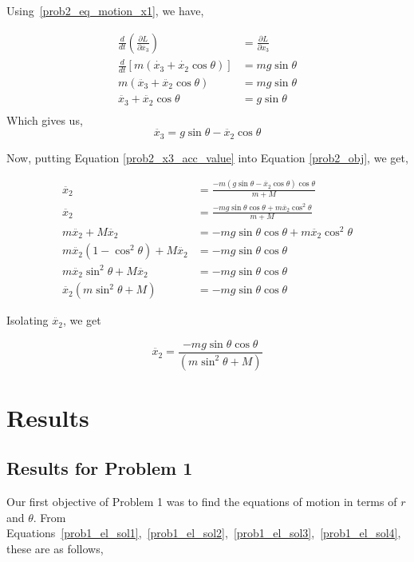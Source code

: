 \documentclass[conference]{IEEEtran}
\begin{document}
Using~\ref{prob2_eq_motion_x1}, we have,

\begin{align*}
    \frac{d}{dt} \left(\frac{\partial L}{\partial \dot{x_3}}\right) &= \frac{\partial L}{ \partial x_3}\\
    \frac{d}{dt} \left[m(\dot{x_3} + \dot{x_2}\cos\theta)\right] &= mg\sin\theta\\
    m (\ddot{x_3} + \ddot{x_2}\cos\theta) &= mg\sin\theta\\
    \ddot{x_3} + \ddot{x_2}\cos\theta &= g\sin\theta\\
\end{align*}
Which gives us,
\begin{equation}\label{prob2_x3_acc_value}
    \ddot{x_3} = g\sin\theta - \ddot{x_2}\cos\theta
\end{equation}

Now, putting Equation \ref{prob2_x3_acc_value} into Equation \ref{prob2_obj}, we get,

\begin{align*}
    \ddot{x_2} &= \frac{- m(g\sin\theta - \ddot{x_2}\cos\theta)\cos\theta}{m + M}\\
    \ddot{x_2} &= \frac{-mg\sin\theta\cos\theta + m\ddot{x_2}\cos^2\theta}{m+M}\\
    m \ddot{x_2} + M \ddot{x_2} &= -mg\sin\theta\cos\theta + m\ddot{x_2}\cos^2\theta\\
    m \ddot{x_2}(1 - \cos^2\theta) + M \ddot{x_2} &= -mg\sin\theta\cos\theta\\
    m \ddot{x_2}\sin^2\theta + M \ddot{x_2} &= -mg\sin\theta\cos\theta\\
    \ddot{x_2}(m \sin^2\theta + M) &= -mg\sin\theta\cos\theta
\end{align*}

Isolating $\ddot{x_2}$, we get

\begin{equation}
    \ddot{x_2} = \frac{-mg\sin\theta\cos\theta}{(m \sin^2\theta + M)}
\end{equation}
\section{Results}

\subsection{Results for Problem 1}

Our first objective of Problem 1 was to find the equations of motion in terms
of $r$ and $\theta$. From Equations~\ref{prob1_el_sol1},~\ref{prob1_el_sol2},~\ref{prob1_el_sol3},~\ref{prob1_el_sol4}, these are as follows,\\
\end{document}
